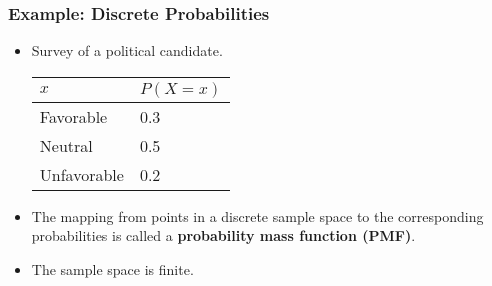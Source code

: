 \begin{frame}
\frametitle{Example: Discrete Probabilities}

\begin{itemize}
\item Survey of a political candidate.  

\begin{center}
\begin{tabular}{ll}
{$x$} & {$P(X=x)$}\\\hline Favorable & \hspace{0.8cm}0.3 \\ Neutral
& \hspace{0.8cm}0.5 \\ Unfavorable & \hspace{0.8cm}0.2 \\\hline
\end{tabular}
\end{center}

\item
The mapping from points in a discrete sample space to the
corresponding probabilities is called a {\bf probability mass function
  (PMF)}.
\item
The sample space is finite.
\end{itemize}
\end{frame}

